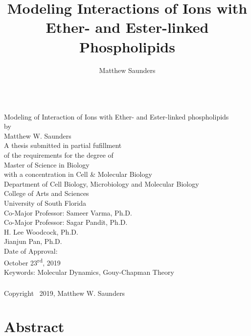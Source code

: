 \documentclass[12pt,openany,final]{book}
\author{Matthew Saunders}
\title{Modeling Interactions of Ions with Ether- and Ester-linked Phospholipids}
\begin{document}
\pagestyle{plain}
\begin{titlepage}
\begin{centering}

~\\[1in]
Modeling of Interaction of Ions with Ether- and Ester-linked phospholipids
~\\[3\baselineskip]
by
~\\[3\baselineskip]
Matthew W. Saunders
~\\[4\baselineskip]
A thesis submitted in partial fufillment\\
of the requirements for the degree of\\
Master of Science in Biology \\ with a concentration in Cell \& Molecular Biology\\
Department of Cell Biology, Microbiology and Molecular Biology\\
College of Arts and Sciences\\
University of South Florida
~\\[2\baselineskip]
Co-Major Professor: Sameer Varma, Ph.D.\\
Co-Major Professor: Sagar Pandit, Ph.D.\\
H. Lee Woodcock, Ph.D.\\
Jianjun Pan, Ph.D.
~\\[2\baselineskip]
Date of Approval:~\\
October 23\textsuperscript{rd}, 2019
~\\[3\baselineskip]
Keywords: Molecular Dynamics, Gouy-Chapman Theory\\
~\\
Copyright \textsuperscript\textcopyright~2019, Matthew W. Saunders\\

\end{centering}
\end{titlepage}
\tableofcontents
{}
\listoftables
\listoffigures

\doublespacing
\chapter*{Abstract}
\end{document}
